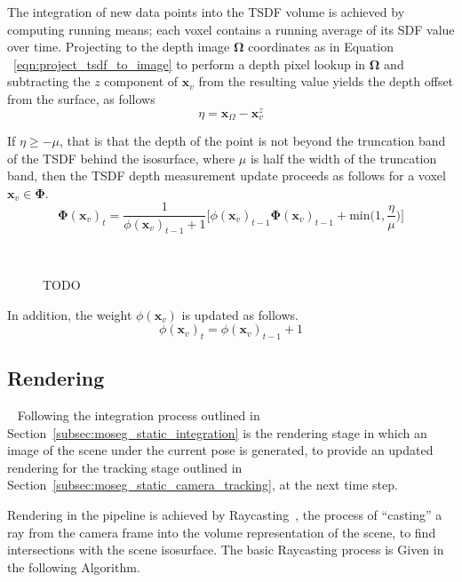 The integration of new data points into the TSDF volume is achieved by computing 
running means; each voxel contains a running average of its SDF value over time.
Projecting to the depth image \(\bm{\Omega}\) coordinates as in Equation
~\ref{eqn:project_tsdf_to_image} to perform a depth pixel lookup in \(\bm{\Omega}\)
and subtracting the \(z\) component of \(\bm{x}_{v}\) from the resulting value
yields the depth offset from the surface, as follows
\begin{equation}
  \label{eqn:integration_offset}
  \eta = \bm{x}_{\Omega} - \bm{x}_{v}^{z}
\end{equation}

If \( \eta \geq -\mu \), that is that the depth of the point is not beyond the
truncation band of the TSDF behind the isosurface, where \( \mu \) is half the 
width of the truncation band, then the TSDF depth measurement update 
proceeds as follows for a voxel \(\bm{x}_{v} \in \bm{\Phi}\).
\begin{equation}
\label{eqn:sdf_update}
\bm{\Phi}{(\bm{x}_{v})}_{t} = \frac{1}{\phi{(\bm{x}_{v})}_{t-1} + 1}
\bigg[\phi{(\bm{x}_{v})}_{t-1}\bm{\bm{\Phi}}{(\bm{x}_{v})}_{t-1} +
\text{min} \bigg( 1, \frac{\eta}{\mu} \bigg)
\bigg]
\end{equation}

\begin{figure}[!htbp]
  \caption{TODO}
~\label{figure:truncation_band}
\end{figure}

In addition, the weight \(\phi(\bm{x}_{v})\) is updated as follows.
\begin{equation}
  \label{eqn:sdf_weight_update}
  \phi{(\bm{x}_{v})}_{t} = \phi{(\bm{x}_{v})}_{t-1} + 1
\end{equation}

\subsection{Rendering}
~\label{subsec:moseg_static_rendering}
Following the integration process outlined in Section~\ref{subsec:moseg_static_integration} 
is the rendering stage in which an image of the scene under the current pose is generated, to 
provide an updated rendering for the tracking stage outlined in Section~\ref{subsec:moseg_static_camera_tracking}, 
at the next time step.

Rendering in the pipeline is achieved by Raycasting~\cite{Roth1982}, the process of 
``casting'' a ray from the camera frame into the volume representation of the scene, to find intersections with 
the scene isosurface. The basic Raycasting process is Given in the following Algorithm.

